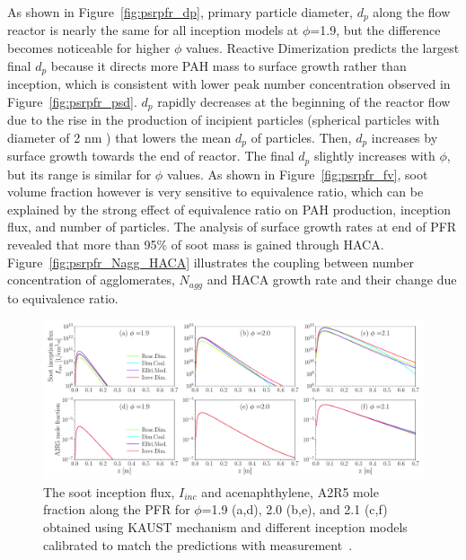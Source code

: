 As shown in Figure~\ref{fig:psrpfr_dp}, primary particle diameter, $d_p$ along the flow reactor is nearly the same for all inception models at $\phi$=1.9, but the difference becomes noticeable for higher $\phi$ values. Reactive Dimerization predicts the largest final $d_p$ because it directs more PAH mass to surface growth rather than inception, which is consistent with lower peak number concentration observed in Figure~\ref{fig:psrpfr_psd}. $d_p$ rapidly decreases at the beginning of the reactor flow due to the rise in the production of incipient particles (spherical particles with diameter of 2 nm ) that lowers the mean $d_p$ of particles. Then, $d_p$ increases by surface growth towards the end of reactor. The final $d_p$ slightly increases with $\phi$, but its range is similar for $\phi$ values. As shown in Figure~\ref{fig:psrpfr_fv}, soot volume fraction however is very sensitive to equivalence ratio, which can be explained by the strong effect of equivalence ratio on PAH production, inception flux, and number of particles. The analysis of surface growth rates at end of PFR revealed that more than 95\% of soot mass is gained through HACA. Figure~\ref{fig:psrpfr_Nagg_HACA} illustrates the coupling between number concentration of agglomerates, $N_{agg}$ and HACA growth rate and their change due to equivalence ratio.  


\begin{figure}[H]
	\centering
	\includegraphics[width=1\textwidth]{Figures/Results/PSR/I_inc_PAH_eq_ratio_all_single_mech.pdf}
	\caption{The soot inception flux, $I_{inc}$ and acenaphthylene, A2R5 mole fraction along the PFR for $\phi$=1.9 (a,d), 2.0 (b,e), and 2.1 (c,f) obtained using KAUST mechanism and different inception models calibrated to match the predictions with measurement~\citep{manzello2007soot}.}
	\label{fig:psrpfr_Iinc_PAH} 
\end{figure}

